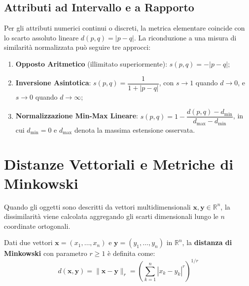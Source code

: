\FloatBarrier
\subsection{Attributi ad Intervallo e a Rapporto}
Per gli attributi numerici continui o discreti, la metrica elementare coincide con lo scarto assoluto lineare $d(p, q) = |p - q|$. La riconduzione a una misura di similarità normalizzata può seguire tre approcci:
\begin{enumerate}
    \item \textbf{Opposto Aritmetico} (illimitato superiormente): $s(p, q) = -|p - q|$;
    \item \textbf{Inversione Asintotica}: $s(p, q) = \dfrac{1}{1 + |p - q|}$, con $s \to 1$ quando $d \to 0$, e $s \to 0$ quando $d \to \infty$;
    \item \textbf{Normalizzazione Min-Max Lineare}: $s(p, q) = 1 - \dfrac{d(p, q) - d_{\min}}{d_{\max} - d_{\min}}$, in cui $d_{\min} = 0$ e $d_{\max}$ denota la massima estensione osservata.
\end{enumerate}

\FloatBarrier
\section{Distanze Vettoriali e Metriche di Minkowski}
\label{sec:dm-vector-minkowski-distances}

Quando gli oggetti sono descritti da vettori multidimensionali $\mathbf{x}, \mathbf{y} \in \mathbb{R}^n$, la dissimilarità viene calcolata aggregando gli scarti dimensionali lungo le $n$ coordinate ortogonali.

\begin{definition}
Dati due vettori $\mathbf{x} = (x_1, \dots, x_n)$ e $\mathbf{y} = (y_1, \dots, y_n)$ in $\mathbb{R}^n$, la \textbf{distanza di Minkowski} con parametro $r \ge 1$ è definita come:
\begin{equation}
    d(\mathbf{x}, \mathbf{y}) = \|\mathbf{x} - \mathbf{y}\|_r = \left( \sum_{k=1}^n |x_k - y_k|^r \right)^{1/r}
    \label{eq:dm-minkowski}
\end{equation}
\end{definition}

